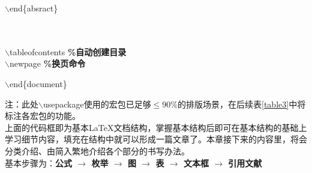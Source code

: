 \documentclass[11pt]{article}
\let\Oldlatex\LaTeX
\renewcommand{\LaTeX}{\textrm{\Oldlatex}}
\begin{document}
\begin{center}
{\begin{minipage}{14.6cm}
{\begin{minipage}{14cm}
    					\hspace*{4pt}$\backslash$end\{absract\}
    			\end{minipage}} \\ \\
    			$\backslash$tableofcontents \textbf{\%自动创建目录}\\
    			$\backslash$newpage \textbf{\%换页命令} \\
    			
    			$\backslash$end\{document\} 
    	\end{minipage}}
    \end{center}
    {\small *注：此处$\backslash$usepackage使用的宏包已足够$\le$90\%的排版场景，在后续表\ref{table3}中将标注各宏包的功能。} \\
    上面的代码框即为基本\LaTeX 文档结构，掌握基本结构后即可在基本结构的基础上学习细节内容，填充在结构中就可以形成一篇文章了。本章接下来的内容里，将会分类介绍、由简入繁地介绍各个部分的书写办法。 \\
    基本步骤为：\textbf{公式 $\to$ 枚举 $\to$ 图 $\to$ 表 $\to$ 文本框 $\to$ 引用文献} 
\end{document}
